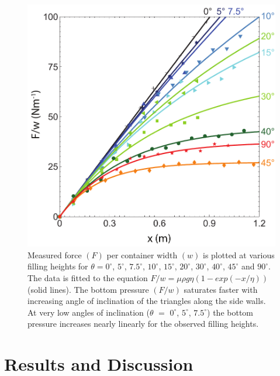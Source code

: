 
% 
\begin{figure}
	\includegraphics[width=\textwidth]{Figures/chapter2/pressurevh}
	\caption{Measured force $(F)$ per container width $(w)$ is plotted at various filling heights for $\theta = 0^{\circ}$, $5^{\circ}$, $7.5^{\circ}$, $10^{\circ}$, $15^{\circ}$, $20^{\circ}$, $30^{\circ}$, $40^{\circ}$, $45^{\circ}$ and $90^{\circ}$. The data is fitted to the equation $F/w = \mu \rho g \eta (1 - exp(-x/\eta))$ (solid lines). The bottom pressure $(F/w)$ saturates faster with increasing angle of inclination of the triangles along the side walls. At very low angles of inclination ($\theta$ $=$ $0^{\circ}$, $5^{\circ}$, $7.5^{\circ}$) the bottom pressure increases nearly linearly for the observed filling heights.}
	\label{fig:pressurevh}
\end{figure}
%

\section{Results and Discussion}

